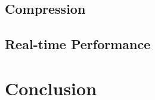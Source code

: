 \subsection{Compression} %
\label{sub:compression}


\subsection{Real-time Performance} %
\label{sub:real_time_performance}


\section{Conclusion}
\label{sec:Conclusion}
